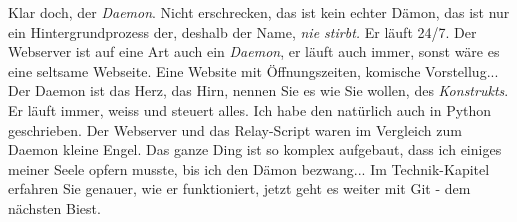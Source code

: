 \documentclass[12pt,titlepage,a4paper]{article}
\begin{document}
Klar doch, der \textit{Daemon}. Nicht erschrecken, das ist kein echter Dämon, das ist nur ein Hintergrundprozess der, deshalb der Name, \textit{nie stirbt.} Er läuft 24/7. Der Webserver ist auf eine Art auch ein \textit{Daemon}, er läuft auch immer, sonst wäre es eine seltsame Webseite. Eine Website mit Öffnungszeiten, komische Vorstellug... Der Daemon ist das Herz, das Hirn, nennen Sie es wie Sie wollen, des \textit{Konstrukts}. Er läuft immer, weiss und steuert alles. Ich habe den natürlich auch in Python geschrieben. Der Webserver und das Relay-Script waren im Vergleich zum Daemon kleine Engel. Das ganze Ding ist so komplex aufgebaut, dass ich einiges meiner Seele opfern musste, bis ich den Dämon bezwang... Im Technik-Kapitel erfahren Sie genauer, wie er funktioniert, jetzt geht es weiter mit Git - dem nächsten Biest.
\end{document}
